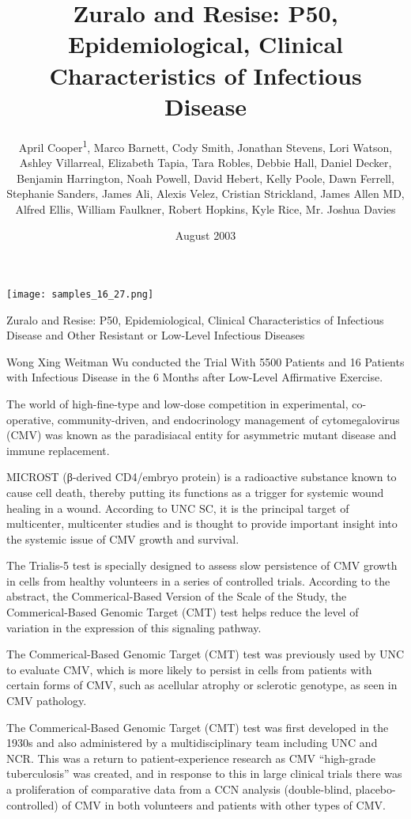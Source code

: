 \documentclass{article}
\title{Zuralo and Resise: P50, Epidemiological, Clinical Characteristics of Infectious Disease}
\author{April Cooper\textsuperscript{1},  Marco Barnett,  Cody Smith,  Jonathan Stevens,  Lori Watson,  Ashley Villarreal,  Elizabeth Tapia,  Tara Robles,  Debbie Hall,  Daniel Decker,  Benjamin Harrington,  Noah Powell,  David Hebert,  Kelly Poole,  Dawn Ferrell,  Stephanie Sanders,  James Ali,  Alexis Velez,  Cristian Strickland,  James Allen MD,  Alfred Ellis,  William Faulkner,  Robert Hopkins,  Kyle Rice,  Mr. Joshua Davies}
\affil{\textsuperscript{1}Osaka University}
\date{August 2003}
\begin{document}
\maketitle

\begin{center}
\begin{minipage}{0.75\linewidth}
\texttt{[image: samples\_16\_27.png]}
\end{minipage}
\end{center}

Zuralo and Resise: P50, Epidemiological, Clinical Characteristics of Infectious Disease and Other Resistant or Low-Level Infectious Diseases

Wong Xing Weitman Wu conducted the Trial With 5500 Patients and 16 Patients with Infectious Disease in the 6 Months after Low-Level Affirmative Exercise.

The world of high-fine-type and low-dose competition in experimental, co-operative, community-driven, and endocrinology management of cytomegalovirus (CMV) was known as the paradisiacal entity for asymmetric mutant disease and immune replacement.

MICROST (β-derived CD4/embryo protein) is a radioactive substance known to cause cell death, thereby putting its functions as a trigger for systemic wound healing in a wound. According to UNC SC, it is the principal target of multicenter, multicenter studies and is thought to provide important insight into the systemic issue of CMV growth and survival.

The Trialis-5 test is specially designed to assess slow persistence of CMV growth in cells from healthy volunteers in a series of controlled trials. According to the abstract, the Commerical-Based Version of the Scale of the Study, the Commerical-Based Genomic Target (CMT) test helps reduce the level of variation in the expression of this signaling pathway.

The Commerical-Based Genomic Target (CMT) test was previously used by UNC to evaluate CMV, which is more likely to persist in cells from patients with certain forms of CMV, such as acellular atrophy or sclerotic genotype, as seen in CMV pathology.

The Commerical-Based Genomic Target (CMT) test was first developed in the 1930s and also administered by a multidisciplinary team including UNC and NCR. This was a return to patient-experience research as CMV “high-grade tuberculosis” was created, and in response to this in large clinical trials there was a proliferation of comparative data from a CCN analysis (double-blind, placebo-controlled) of CMV in both volunteers and patients with other types of CMV.
\end{document}

